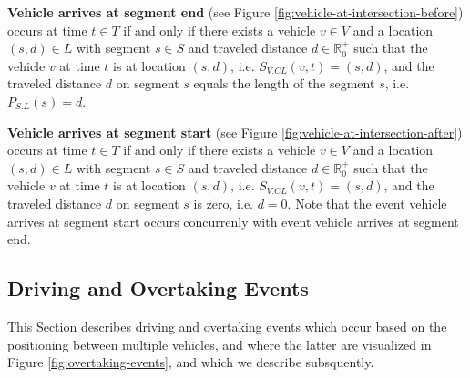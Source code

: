 \documentclass[graybox]{svmult}
\begin{document}
\noindent
\textbf{Vehicle arrives at segment end} (see Figure \ref{fig:vehicle-at-intersection-before})
occurs at time $t \in T$ if and only if there exists a vehicle $v \in V$ and a location $(s,d) \in L$ with segment $s \in S$ and traveled distance $d \in \mathbb{R}_0^+$ such that the vehicle $v$ at time $t$ is at location $(s,d)$, i.e. $S_{V.CL}(v,t) = (s,d)$, and the traveled distance $d$ on segment $s$ equals the length of the segment $s$, i.e. $P_{S.L}(s) = d$.

\vspace{4mm}
\noindent
\textbf{Vehicle arrives at segment start} (see Figure \ref{fig:vehicle-at-intersection-after})
occurs at time $t \in T$ if and only if there exists a vehicle $v \in V$ and a location $(s,d) \in L$ with segment $s \in S$ and traveled distance $d \in \mathbb{R}_0^+$ such that the vehicle $v$ at time $t$ is at location $(s,d)$, i.e. $S_{V.CL}(v,t) = (s,d)$, and the traveled distance $d$ on segment $s$ is zero, i.e. $d = 0$. Note that the event vehicle arrives at segment start occurs concurrenly with event vehicle arrives at segment end.
\vspace{-2mm}

\subsection{Driving and Overtaking Events}
\label{sec:overtaking-events}

This Section describes driving and overtaking events which occur based on the positioning between multiple vehicles, and where the latter are visualized in Figure \ref{fig:overtaking-events}, and which we describe subsquently.
\vspace{4mm}
\end{document}
